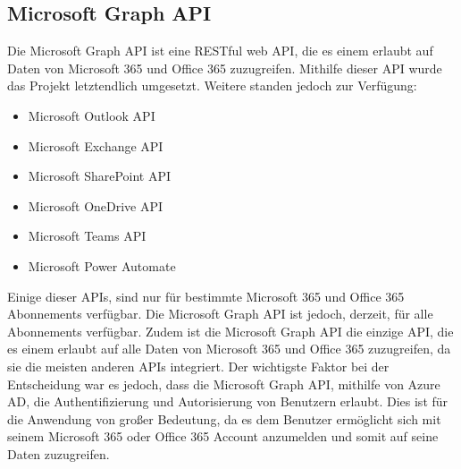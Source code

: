 
\subsection{Microsoft Graph API}\label{subsec:microsoft-graph-api}
Die Microsoft Graph API ist eine \gls{RESTful} web API, die es einem erlaubt auf Daten von Microsoft 365 und Office 365 zuzugreifen.
Mithilfe dieser API wurde das Projekt letztendlich umgesetzt.
Weitere standen jedoch zur Verfügung:
\begin{itemize}
    \item Microsoft Outlook API
    \item Microsoft Exchange API
    \item Microsoft SharePoint API
    \item Microsoft OneDrive API
    \item Microsoft Teams API
    \item Microsoft Power Automate
\end{itemize}
Einige dieser APIs, sind nur für bestimmte Microsoft 365 und Office 365 Abonnements verfügbar.
Die Microsoft Graph API ist jedoch, derzeit, für alle Abonnements verfügbar.
Zudem ist die Microsoft Graph API die einzige API, die es einem erlaubt auf alle Daten von Microsoft 365 und Office 365 zuzugreifen, da sie die meisten anderen APIs integriert.
Der wichtigste Faktor bei der Entscheidung war es jedoch, dass die Microsoft Graph API, mithilfe von Azure AD, die Authentifizierung und Autorisierung von Benutzern erlaubt.
Dies ist für die Anwendung von großer Bedeutung, da es dem Benutzer ermöglicht sich mit seinem Microsoft 365 oder Office 365 Account anzumelden und somit auf seine Daten zuzugreifen.

